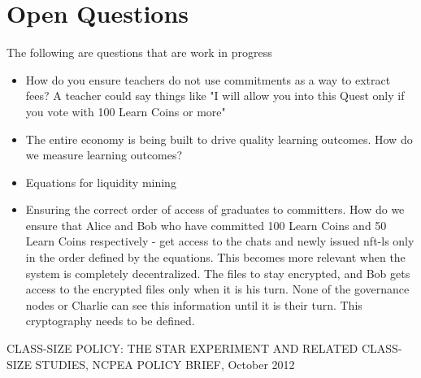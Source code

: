 \documentclass{article}
\begin{document}
  \section{Open Questions}
    The following are questions that are work in progress
    \begin{itemize}
      \item How do you ensure teachers do not use commitments as a way to extract fees? A teacher could say things like "I will allow you into  this Quest only if you vote with 100 Learn Coins or more"
      \item The entire economy is being built to drive quality learning outcomes. How do we measure learning outcomes?
      \item Equations for liquidity mining
      \item Ensuring the correct order of access of graduates to committers. How do we ensure that Alice and Bob who have committed 100 Learn Coins and 50 Learn Coins respectively - get access to the chats and newly issued nft-ls only in the order defined by the equations. This becomes more relevant when the system is completely decentralized. The files to stay encrypted, and Bob gets access to the encrypted files only when it is his turn. None of the governance nodes or Charlie can see this information until it is their turn. This cryptography needs to be defined.
    \end{itemize}

  \begin{thebibliography}{9}
     CLASS-SIZE POLICY: THE STAR EXPERIMENT AND RELATED CLASS-SIZE STUDIES, NCPEA	POLICY	BRIEF, October 2012
  \end{thebibliography}
\end{document}

